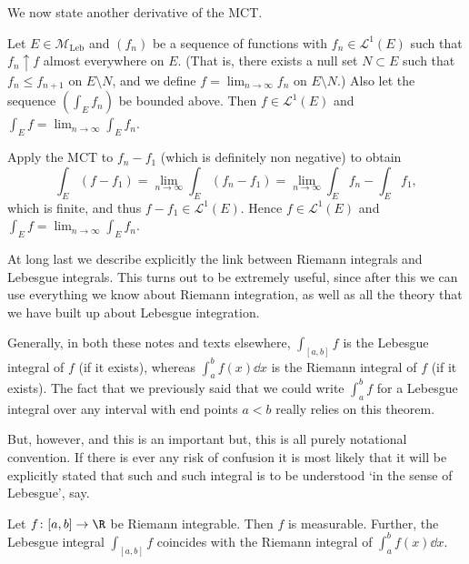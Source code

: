 \documentclass{maths}
\newcommand{\mleb}{\mathcal{M}_{\text{Leb}}}
\begin{document}
We now state another derivative of the MCT.

\begin{thm}
    Let $E\in\mleb$ and $(f_n)$ be a sequence of functions with $f_n\in \mathcal{L}^1(E)$ such that $f_n\uparrow f$ almost everywhere on $E$.
    (That is, there exists a null set $N\subset E$ such that $f_n\leqslant f_{n+1}$ on $E\setminus N$, and we define $f=\lim_{n\to\infty} f_n$ on $E\setminus N$.)
    Also let the sequence $(\int_E f_n)$ be bounded above.
    Then $f\in \mathcal{L}^1(E)$ and $\int_E f = \lim_{n\to\infty}\int_E f_n$.
\end{thm}

\begin{prf}
    Apply the MCT to $f_n-f_1$ (which is definitely non negative) to obtain
    \[
        \int_E (f-f_1) =
        \lim_{n\to\infty} \int_E (f_n-f_1) =
        \lim_{n\to\infty} \int_E f_n - \int_E f_1,
    \]
    which is finite, and thus $f-f_1\in \mathcal{L}^1(E)$.
    Hence $f\in \mathcal{L}^1(E)$ and $\int_E f = \lim_{n\to\infty} \int_E f_n$.
\end{prf}

At long last we describe explicitly the link between Riemann integrals and Lebesgue integrals.
This turns out to be extremely useful, since after this we can use everything we know about Riemann integration, as well as all the theory that we have built up about Lebesgue integration.

\begin{rem}
    Generally, in both these notes and texts elsewhere, $\int_{[a,b]} f$ is the Lebesgue integral of $f$ (if it exists), whereas $\int_a^b f(x)\dd{x}$ is the Riemann integral of $f$ (if it exists).
    The fact that we previously said that we could write $\int_a^b f$ for a Lebesgue integral over any interval with end points $a<b$ really relies on this theorem.

    But, however, and this is an important but, this is all purely notational convention.
    If there is ever any risk of confusion it is most likely that it will be explicitly stated that such and such integral is to be understood `in the sense of Lebesgue', say.
\end{rem}

\begin{thm}
    Let $f\colon[a,b]\to\R$ be Riemann integrable.
    Then $f$ is measurable.
    Further, the Lebesgue integral $\int_{[a,b]} f$ coincides with the Riemann integral of $\int_a^b f(x)\dd{x}$.
\end{thm}
\end{document}
